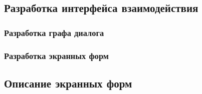 \subsection{Разработка интерфейса взаимодействия}

\subsubsection{Разработка графа диалога}
\subsubsection{Разработка экранных форм}

\subsection{Описание экранных форм}